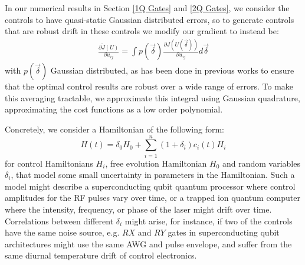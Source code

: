 \documentclass[aps,nofootinbib,pra,notitlepage,twocolumn]{revtex4-1}
\begin{document}
In our numerical results in Section \ref{1Q Gates} and \ref{2Q Gates}, we consider the controls to have quasi-static Gaussian distributed errors, so to generate controls that are robust drift in these controls we modify our gradient to instead be:
\begin{align}\label{quadrature}
\frac{\partial \tilde J(U)}{\partial u_{ij}} =
\int p(\vec{\delta})\frac{\partial J(U(\vec{\delta}))}{\partial u_{ij}} d\vec{\delta}
\end{align}
with $p(\vec{\delta})$ Gaussian distributed, as has been done in previous works \cite{Goerz2014} to ensure that the optimal control results are robust over a wide range of errors. To make this averaging tractable, we approximate this integral using Gaussian quadrature, approximating the cost functions as a low order polynomial. 

Concretely, we consider a Hamiltonian of the following form:
\begin{equation}\label{eq:2}
  H(t) = \delta_0H_0 + \sum_{i=1}^n (1 + \delta_i)c_i(t)H_i
\end{equation}
for control Hamiltonians $H_i$, free evolution Hamiltonian $H_0$ and random variables $\delta_i$, that model some small uncertainty in parameters in the Hamiltonian. Such a model might describe a superconducting qubit quantum processor where control amplitudes for the RF pulses vary over time, or a trapped ion quantum computer where the intensity, frequency, or phase of the laser might drift over time\cite{Kelly2018, Lekitsch2017}. Correlations between different $\delta_i$ might arise, for instance, if two of the controls have the same noise source, e.g. $RX$ and $RY$ gates in superconducting qubit architectures might use the same AWG and pulse envelope, and suffer from the same diurnal temperature drift of control electronics.
\end{document}
